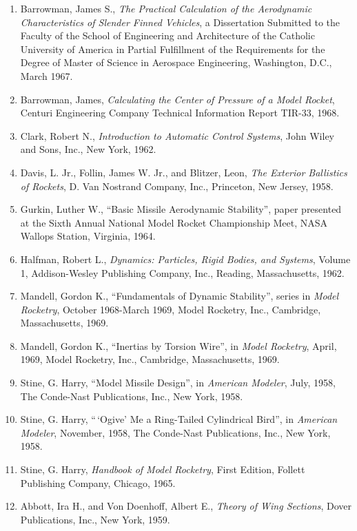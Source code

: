 \label{ch2:sec:refs}
\begin{enumerate}[label=\arabic*.,ref=\arabic*,leftmargin=*]
  \item\label{ch2:ref:1} Barrowman, James S., \emph{The Practical Calculation of the Aerodynamic Characteristics of Slender Finned Vehicles}, a Dissertation Submitted to the Faculty of the School of Engineering and Architecture of the Catholic University of America in Partial Fulfillment of the Requirements for the Degree of Master of Science in Aerospace Engineering, Washington, D.C., March 1967.
  \item\label{ch2:ref:2} Barrowman, James, \emph{Calculating the Center of Pressure of a Model Rocket}, Centuri Engineering Company Technical Information Report TIR-33, 1968.
  \item\label{ch2:ref:3} Clark, Robert N., \emph{Introduction to Automatic Control Systems}, John Wiley and Sons, Inc., New York, 1962.
  \item\label{ch2:ref:4} Davis, L. Jr., Follin, James W. Jr., and Blitzer, Leon, \emph{The Exterior Ballistics of Rockets}, D. Van Nostrand Company, Inc., Princeton, New Jersey, 1958.
  \item\label{ch2:ref:5} Gurkin, Luther W., ``Basic Missile Aerodynamic Stability'', paper presented at the Sixth Annual National Model Rocket Championship Meet, NASA Wallops Station, Virginia, 1964.
  \item\label{ch2:ref:6} Halfman, Robert L., \emph{Dynamics: Particles, Rigid Bodies, and Systems}, Volume 1, Addison-Wesley Publishing Company, Inc., Reading, Massachusetts, 1962.
  \item\label{ch2:ref:7} Mandell, Gordon K., ``Fundamentals of Dynamic Stability'', series in \emph{Model Rocketry}, October 1968-March 1969, Model Rocketry, Inc., Cambridge, Massachusetts, 1969.
  \item\label{ch2:ref:8} Mandell, Gordon K., ``Inertias by Torsion Wire'', in \emph{Model Rocketry}, April, 1969, Model Rocketry, Inc., Cambridge, Massachusetts, 1969.
  \item\label{ch2:ref:9} Stine, G. Harry, ``Model Missile Design'', in \emph{American Modeler}, July, 1958, The Conde-Nast Publications, Inc., New York, 1958.
  \item\label{ch2:ref:10} Stine, G. Harry, ``\,`Ogive' Me a Ring-Tailed Cylindrical Bird'', in \emph{American Modeler}, November, 1958, The Conde-Nast Publications, Inc., New York, 1958.
  \item\label{ch2:ref:11} Stine, G. Harry, \emph{Handbook of Model Rocketry}, First Edition, Follett Publishing Company, Chicago, 1965.
  \item\label{ch2:ref:12} Abbott, Ira H., and Von Doenhoff, Albert E., \emph{Theory of Wing Sections}, Dover Publications, Inc., New York, 1959.
\end{enumerate}
